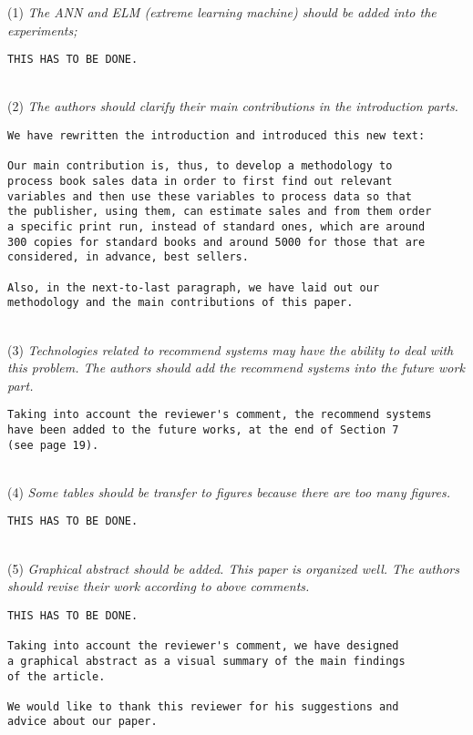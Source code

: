 \documentclass[preprint]{elsarticle}
\begin{document}
\noindent (1) \emph{The ANN and ELM (extreme learning machine) should be added into the experiments; } 

\begin{verbatim}
THIS HAS TO BE DONE.
\end{verbatim}

~\\
\noindent (2) \emph{The authors should clarify their main contributions in the introduction parts.}

\begin{verbatim}
We have rewritten the introduction and introduced this new text:

Our main contribution is, thus, to develop a methodology to 
process book sales data in order to first find out relevant 
variables and then use these variables to process data so that 
the publisher, using them, can estimate sales and from them order 
a specific print run, instead of standard ones, which are around 
300 copies for standard books and around 5000 for those that are 
considered, in advance, best sellers.

Also, in the next-to-last paragraph, we have laid out our 
methodology and the main contributions of this paper.
\end{verbatim}

~\\
\noindent (3) \emph{Technologies related to recommend systems may have the ability to deal with this problem. The authors should add the recommend systems into the future work part. } 

\begin{verbatim}
Taking into account the reviewer's comment, the recommend systems
have been added to the future works, at the end of Section 7 
(see page 19).
\end{verbatim}

~\\
\noindent (4) \emph{Some tables should be transfer to figures because there are too many figures. } 

\begin{verbatim}
THIS HAS TO BE DONE.
\end{verbatim}

~\\
\noindent (5) \emph{Graphical abstract should be added. This paper is organized well. The authors should revise their work according to above comments. } 

\begin{verbatim}
THIS HAS TO BE DONE.

Taking into account the reviewer's comment, we have designed 
a graphical abstract as a visual summary of the main findings 
of the article.

We would like to thank this reviewer for his suggestions and 
advice about our paper.
\end{verbatim}
\end{document}
